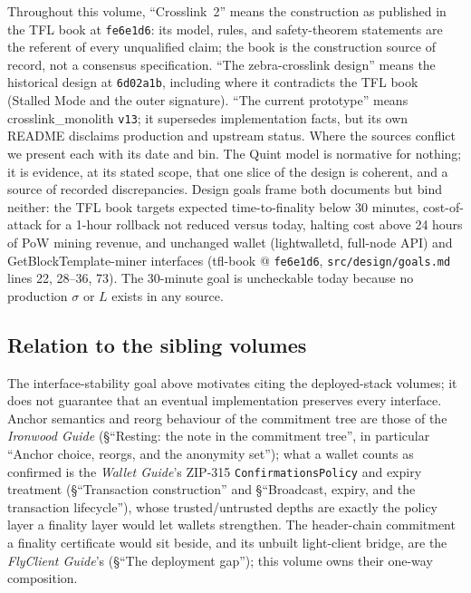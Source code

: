 \documentclass[11pt,a4paper]{article}
\theoremstyle{definition}
\begin{document}
Throughout this volume, ``Crosslink~2'' means the construction as
published in the TFL book at \texttt{fe6e1d6}: its model, rules, and
safety-theorem statements are the referent of every unqualified claim;
the book is the construction source of record, not a consensus
specification. ``The zebra-crosslink design'' means the historical design
at \texttt{6d02a1b}, including where it contradicts the TFL book (Stalled
Mode and the outer signature). ``The current prototype'' means
\textsf{crosslink\_monolith} \texttt{v13}; it supersedes implementation
facts, but its own README disclaims production and upstream status. Where
the sources conflict we present each with its date and bin. The Quint model
is normative for nothing; it is evidence, at its stated scope, that one
slice of the design is coherent, and a source of recorded discrepancies.
Design goals frame both documents but bind neither: the TFL book targets
expected time-to-finality below 30 minutes, cost-of-attack for a 1-hour
rollback not reduced versus today, halting cost above 24 hours of PoW
mining revenue, and unchanged wallet (lightwalletd, full-node API) and
GetBlockTemplate-miner interfaces (tfl-book @ \texttt{fe6e1d6},
\texttt{src/design/goals.md} lines 22, 28--36, 73). The 30-minute goal
is uncheckable today because no production $\sigma$ or $L$ exists in any
source.

\subsection{Relation to the sibling volumes}\label{sec:xl-siblings}

The interface-stability goal above motivates citing the deployed-stack
volumes; it does not guarantee that an eventual implementation preserves
every interface. Anchor semantics and reorg behaviour of the commitment
tree are those of the \emph{Ironwood Guide} (\S``Resting: the note in the
commitment tree'', in particular ``Anchor choice, reorgs, and the anonymity
set''); what a wallet counts as confirmed is the
\emph{Wallet Guide}'s ZIP-315 \texttt{ConfirmationsPolicy} and expiry
treatment (\S``Transaction construction'' and \S``Broadcast, expiry, and
the transaction lifecycle''), whose trusted/untrusted depths are exactly
the policy layer a finality layer would let wallets strengthen. The
header-chain commitment a finality certificate would sit beside, and its
unbuilt light-client bridge, are the \emph{FlyClient Guide}'s
(\S``The deployment gap''); this volume owns their one-way composition.
\end{document}

